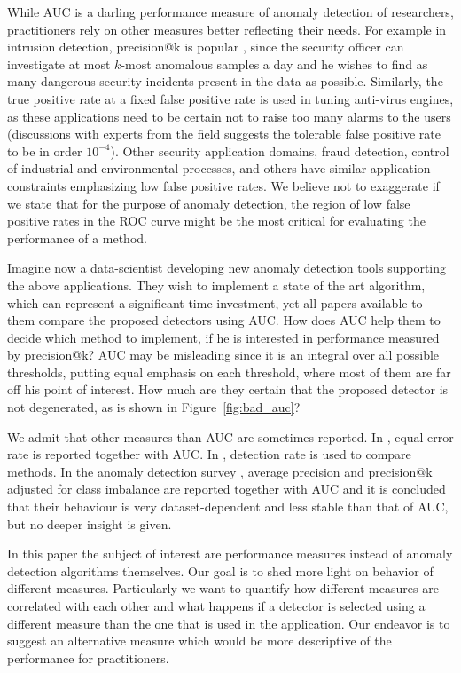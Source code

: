 While AUC is a darling performance measure of anomaly detection of researchers, practitioners rely on other measures better reflecting their needs. For example in intrusion detection, precision@k is popular \cite{grill2016learning}, since the security officer can investigate at most $k$-most anomalous samples a day and he wishes to find as many dangerous security incidents present in the data as possible. Similarly, the true positive rate at a fixed false positive rate is used in tuning anti-virus engines, as these applications need to be certain not to raise too many alarms to the users (discussions with experts from the field suggests the tolerable false positive rate to be in order $10^{-4}$). Other security application domains, fraud detection, control of industrial and environmental processes, and others have similar application constraints emphasizing low false positive rates. We believe not to exaggerate if we state that for the purpose of anomaly detection, the region of low false positive rates in the ROC curve might be the most critical for evaluating the performance of a method. 

Imagine now a data-scientist developing new anomaly detection tools supporting the above applications. They wish to implement a state of the art algorithm, which can represent a significant time investment, yet all papers available to them compare the proposed detectors using AUC. How does AUC help them to decide which method to implement, if he is interested in performance measured by precision@k? AUC may be misleading since it is an integral over all possible thresholds, putting equal emphasis on each threshold, where most of them are far off his point of interest. How much are they certain that the proposed detector is not degenerated, as is shown in Figure~\ref{fig:bad_auc}?

We admit that other measures than AUC are sometimes reported. In \cite{mahadevan2010anomaly}, equal error rate is reported together with AUC. In \cite{lazarevic2003comparative}, detection rate is used to compare methods. In the anomaly detection survey \cite{campos2016evaluation}, average precision and precision@k adjusted for class imbalance are reported together with AUC and it is concluded that their behaviour is very dataset-dependent and less stable than that of AUC, but no deeper insight is given.

In this paper the subject of interest are performance measures instead of anomaly detection algorithms themselves. Our goal is to shed more light on behavior of different measures. Particularly we want to quantify how different measures are correlated with each other and what happens if a detector is selected using a different measure than the one that is used in the application. Our endeavor is to suggest an alternative measure which would be more descriptive of the performance for practitioners. 

